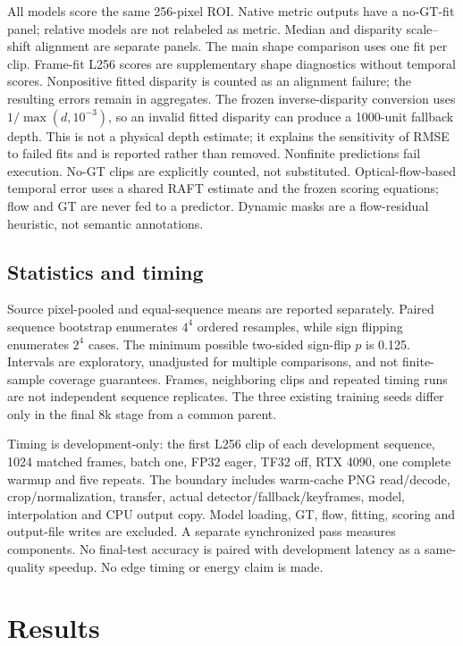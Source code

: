 \documentclass[mathematics,article,submit,moreauthors]{Definitions/mdpi}
\begin{document}
All models score the same 256-pixel ROI. Native metric outputs have a no-GT-fit panel;
relative models are not relabeled as metric. Median and disparity scale--shift alignment
are separate panels. The main shape comparison uses one fit per clip. Frame-fit L256
scores are supplementary shape diagnostics without temporal scores. Nonpositive fitted
disparity is counted as an alignment failure; the resulting errors remain in aggregates.
The frozen inverse-disparity conversion uses $1/\max(d,10^{-3})$, so an invalid
fitted disparity can produce a 1000-unit fallback depth. This is not a physical depth
estimate; it explains the sensitivity of RMSE to failed fits and is reported rather than removed.
Nonfinite predictions fail execution. No-GT clips are explicitly counted, not substituted.
Optical-flow-based temporal error uses a shared RAFT estimate and the frozen scoring
equations; flow and GT are never fed to a predictor. Dynamic masks are a flow-residual
heuristic, not semantic annotations.

\subsection{Statistics and timing}
Source pixel-pooled and equal-sequence means are reported separately. Paired sequence
bootstrap enumerates $4^4$ ordered resamples, while sign flipping enumerates $2^4$ cases.
The minimum possible two-sided sign-flip $p$ is 0.125. Intervals are exploratory,
unadjusted for multiple comparisons, and not finite-sample coverage guarantees.
Frames, neighboring clips and repeated timing runs are not independent sequence replicates.
The three existing training seeds differ only in the final 8k stage from a common parent.

Timing is development-only: the first L256 clip of each development sequence, 1024 matched
frames, batch one, FP32 eager, TF32 off, RTX 4090, one complete warmup and five repeats.
The boundary includes warm-cache PNG read/decode, crop/normalization, transfer, actual
detector/fallback/keyframes, model, interpolation and CPU output copy. Model loading,
GT, flow, fitting, scoring and output-file writes are excluded. A separate synchronized
pass measures components. No final-test accuracy is paired with development latency
as a same-quality speedup. No edge timing or energy claim is made.

\section{Results}

\end{document}
